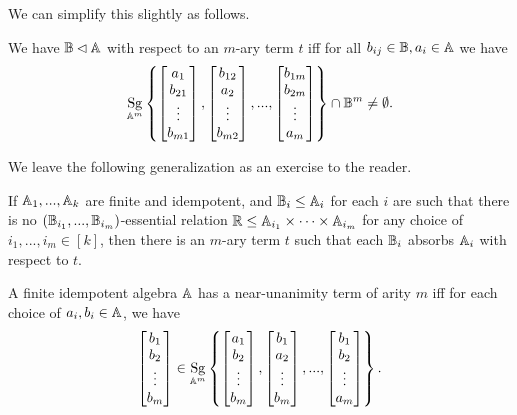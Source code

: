 \documentclass[letterpaper,11pt]{article}
\DeclareMathOperator{\Sg}{Sg}
\begin{document}
We can simplify this slightly as follows.

\begin{cor} We have $\mathbb{B} \lhd \mathbb{A}$ with respect to an $m$-ary term $t$ iff for all $b_{ij} \in \mathbb{B}, a_i \in \mathbb{A}$ we have
\[
\Sg_{\bA^m}\left\{\begin{bmatrix}a_1\\ b_{21}\\ \vdots\\ b_{m1}\end{bmatrix}, \begin{bmatrix}b_{12}\\ a_2\\ \vdots\\ b_{m2}\end{bmatrix}, ..., \begin{bmatrix}b_{1m}\\ b_{2m}\\ \vdots\\ a_m\end{bmatrix}\right\} \cap \bB^m \ne \emptyset.
\]
\end{cor}

We leave the following generalization as an exercise to the reader.

\begin{thm} If $\mathbb{A}_1, ..., \mathbb{A}_k$ are finite and idempotent, and $\mathbb{B}_i \le \mathbb{A}_i$ for each $i$ are such that there is no $(\mathbb{B}_{i_1}, ..., \mathbb{B}_{i_m})$-essential relation $\mathbb{R} \le \mathbb{A}_{i_1} \times \cdots \times \mathbb{A}_{i_m}$ for any choice of $i_1, ..., i_m \in [k]$, then there is an $m$-ary term $t$ such that each $\mathbb{B}_i$ absorbs $\mathbb{A}_i$ with respect to $t$.
\end{thm}

\begin{cor} A finite idempotent algebra $\mathbb{A}$ has a near-unanimity term of arity $m$ iff for each choice of $a_i, b_i \in \mathbb{A}$, we have
\[
\begin{bmatrix}b_1\\ b_2\\ \vdots\\ b_m\end{bmatrix} \in \Sg_{\bA^m}\left\{\begin{bmatrix}a_1\\ b_2\\ \vdots\\ b_m\end{bmatrix}, \begin{bmatrix}b_1\\ a_2\\ \vdots\\ b_m\end{bmatrix}, ..., \begin{bmatrix}b_1\\ b_2\\ \vdots\\ a_m\end{bmatrix}\right\}.
\]
\end{cor}
\end{document}
